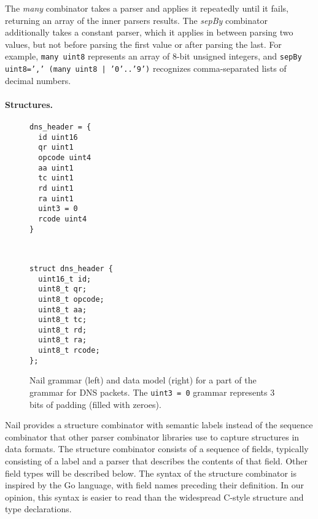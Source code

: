 The \emph{many} combinator takes a parser and applies it repeatedly
until it fails, returning an array of the inner parsers results. The
\emph{sepBy} combinator
additionally takes a constant parser, which it applies in between parsing
two values, but not before parsing the first value or after parsing the
last.
For example, \texttt{many uint8} represents an array of 8-bit unsigned
integers, and \texttt{sepBy uint8=',' (many uint8 | '0'..'9')} recognizes
comma-separated lists of decimal numbers.

\paragraph{Structures.}

\begin{figure}[tb]

\begin{minipage}{0.45\columnwidth}
\begin{verbatim}
dns_header = {
  id uint16
  qr uint1
  opcode uint4
  aa uint1 
  tc uint1
  rd uint1
  ra uint1
  uint3 = 0
  rcode uint4
}
\end{verbatim} 
\end{minipage}
~
\begin{minipage}{0.45\columnwidth}
\begin{verbatim}
struct dns_header {
  uint16_t id;
  uint8_t qr;
  uint8_t opcode;
  uint8_t aa;
  uint8_t tc;
  uint8_t rd;
  uint8_t ra;
  uint8_t rcode;
};
\end{verbatim} 
\end{minipage}

\caption{Nail grammar (left) and data model (right) for a part of the
grammar for DNS packets.  The \texttt{uint3 = 0} grammar represents
3 bits of padding (filled with zeroes).}
\label{fig:dns-struct}
\end{figure}


Nail provides a structure combinator with semantic labels instead of the sequence combinator that
other parser combinator libraries use to capture structures in data formats. 
The structure combinator consists of a sequence of fields, typically consisting of a label and a
parser that describes the contents of that field. Other field types will be described below.
 The syntax of the structure combinator is inspired by the Go language\cite{golang}, with field names preceding their definition.
In our opinion, this syntax is easier to read than the widespread C-style structure and type
declarations.

